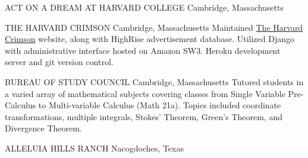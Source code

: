 \documentclass[]{friggeri-cv} %
\begin{document}
{ACT ON A DREAM AT HARVARD COLLEGE}
{Cambridge, Massachusetts}
{}
\begin{detailed}
{THE HARVARD CRIMSON}
{Cambridge, Massachusetts}
{
{Maintained \href{http://thecrimson.com}{The Harvard Crimson} website, along with HighRise advertisement database. Utilized Django with administrative interface hosted on Amazon SW3. Heroku development server and git version control.}}

{BUREAU OF STUDY COUNCIL}
{Cambridge, Massachusetts}
{
{Tutored students in a varied array of mathematical subjects covering classes from Single Variable Pre-Calculus to Multi-variable Calculus (Math 21a). Topics included coordinate transformations, multiple integrals, Stokes' Theorem, Green's Theorem, and Divergence Theorem.}}

{ALLELUIA HILLS RANCH}
{Nacogdoches, Texas}
{}
\end{detailed}
\end{document}
